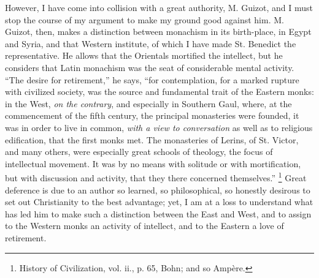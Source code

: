 However, I have come into collision with a great authority, M.
Guizot, and I must stop the course of my argument to make my ground
good against him. M. Guizot, then, makes a distinction between
monachism in its birth-place, in Egypt and Syria, and that Western
institute, of which I have made St. Benedict the representative. He
allows that the Orientals mortified the intellect, but he considers
that Latin monachism was the seat of considerable mental activity.
``The desire for retirement,'' he says, ``for
contemplation, for a marked rupture with civilized society, was
the source and fundamental trait of the Eastern monks: in the West, \emph{on
the contrary}, and especially in Southern Gaul, where, at the
commencement of the fifth century, the principal monasteries were
founded, it was in order to live in common, \emph{with a view to
conversation} as well as to religious edification, that the first
monks met. The monasteries of Lerins, of St. Victor, and many others,
were especially great schools of theology, the focus of intellectual
movement. It was by no means with solitude or with mortification, but
with discussion and activity, that they there concerned
themselves.'' \footnote{History of
Civilization, vol. ii., p. 65, Bohn; and so Ampère.} Great
deference is due to an author so learned, so philosophical, so
honestly desirous to set out Christianity to the best advantage; yet,
I am at a loss to understand what has led him to make such a
distinction between the East and West, and to assign to the Western
monks an activity of intellect, and to the Eastern a love of
retirement.

